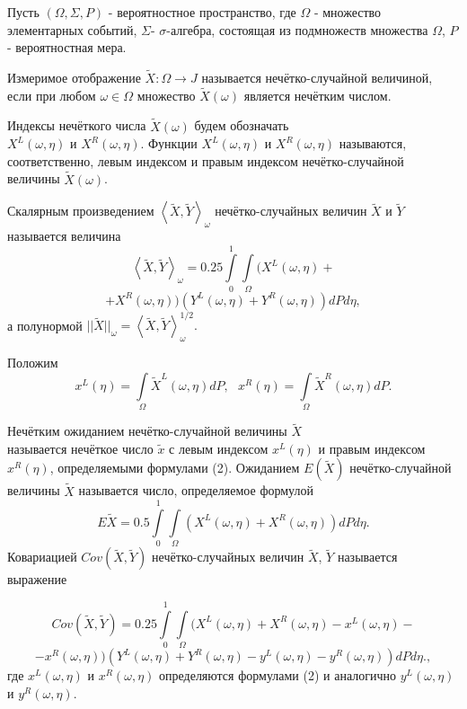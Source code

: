 Пусть $(\Omega, \Sigma, P)$ - вероятностное пространство, где $\Omega$ - множество элементарных событий, $\Sigma $- $\sigma$-алгебра, состоящая из подмножеств множества $\Omega$, $P$ - вероятностная мера.

Измеримое отображение $\tilde{X}:\Omega\rightarrow J$ называется нечётко-случайной величиной, если при любом $\omega\in\Omega$ множество $\tilde{X}(\omega)$ является нечётким числом.

Индексы нечёткого числа $\tilde{X}(\omega)$ будем обозначать
\\$X^L(\omega, \eta)$ и $X^R(\omega, \eta)$. Функции $X^L(\omega, \eta)$ и $X^R(\omega, \eta)$ называются, соответственно, левым индексом и правым индексом нечётко-случайной величины $\tilde{X}(\omega)$.



Скалярным произведением $\left\langle \tilde{X}, \tilde{Y}\right\rangle_{\omega}$ нечётко-случайных величин $\tilde{X}$ и $\tilde{Y}$ называется величина
$$
\left\langle \tilde{X}, \tilde{Y}\right\rangle_{\omega} = 0.25\int\limits_0^1\int\limits_{\Omega}(X^L(\omega, \eta) +
$$
$$
 + X^R(\omega, \eta))(Y^L(\omega, \eta) + Y^R(\omega, \eta))dPd\eta,
$$
а полунормой $||\tilde{X}||_{\omega} = \left\langle \tilde{X}, \tilde{Y}\right\rangle_{\omega}^{1/2}.$


Положим
\begin{equation}
x^L(\eta) = \int\limits_{\Omega}\tilde{X}^L(\omega, \eta)dP,\,\,\,\,x^R(\eta) = \int\limits_{\Omega}\tilde{X}^R(\omega, \eta)dP.
\end{equation}

Нечётким ожиданием нечётко-случайной величины $\tilde{X}$
\\называется нечёткое число $\tilde{x}$ с левым индексом $x^L(\eta)$ и правым индексом $x^R(\eta)$, определяемыми формулами (2). Ожиданием $E(\tilde{X})$ нечётко-случайной величины $\tilde{X}$ называется число, определяемое формулой
$$
E\tilde{X} = 0.5\int\limits_0^1\int\limits_{\Omega}(X^L(\omega, \eta) + X^R(\omega, \eta))dPd\eta.
$$
Ковариацией $Cov(\tilde{X}, \tilde{Y})$ нечётко-случайных величин $\tilde{X}$, $\tilde{Y}$ называется выражение

$$
Cov(\tilde{X}, \tilde{Y}) = 0.25\int\limits_0^1\int\limits_{\Omega}(X^L(\omega, \eta) + X^R(\omega, \eta) - x^L(\omega, \eta) - $$
$$
-x^R(\omega, \eta))(Y^L(\omega, \eta) + Y^R(\omega, \eta) - y^L(\omega, \eta) - y^R(\omega, \eta))dPd\eta.
,
$$
где $x^L(\omega, \eta)$ и $x^R(\omega, \eta)$ определяются формулами (2) и аналогично $y^L(\omega, \eta)$ и $y^R(\omega, \eta)$.


